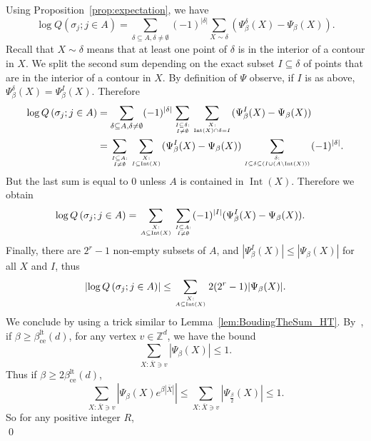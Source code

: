\documentclass{amsart}
\newcommand{\field}[1]{\mathbb{#1}}
\newcommand{\Z}{\field{Z}}
\DeclareMathOperator\Int{Int}
\numberwithin{equation}{section}
\theoremstyle{remark}
\renewenvironment{proof}[1][Proof]{\begin{trivlist}
\item[\hskip \labelsep {\bfseries #1:}]}{\qed\end{trivlist}}
\begin{document}
\begin{proof}
Using Proposition~\ref{prop:expectation}, we have
\[
\log Q \left(\sigma_j; j \in A \right)  = \sum_{\delta \subseteq A, \delta \neq \emptyset} (-1)^{|\delta|} \sum_{X \sim \delta} (\Psi^{\delta}_{\beta}(X) -  \Psi_{\beta}(X)).\]
Recall that $X \sim \delta$ means that at least one point of $\delta$ is in the interior of a contour in $X$.
We split the second sum depending on the exact subset $I \subseteq \delta$ of points that are in the interior of a contour in $X$.
By definition of $\Psi$ observe, if $I$ is as above, $\Psi^{\delta}_{\beta}(X)= \Psi^{I}_{\beta}(X)$.
Therefore
\begin{align*}
\log Q \left(\sigma_j; j \in A \right) &=  \sum_{\delta \subseteq A, \delta \neq \emptyset} (-1)^{|\delta|} \sum_{ I \subseteq \delta : \atop I \neq \emptyset} \sum_{X : \atop \Int(X) \cap \delta =I } (\Psi^{I}_{\beta}(X) -  \Psi_{\beta}(X))
\\ &= \sum_{ I \subseteq A : \atop I \neq \emptyset} \sum_{X : \atop I \subseteq \Int(X)} (\Psi^{I}_{\beta}(X) -  \Psi_{\beta}(X)) \sum_{\delta : \atop I \subseteq \delta \subseteq (I \cup  (A \setminus \Int(X)))} (-1)^{|\delta|}.
\end{align*}
But the last sum is equal to $0$ unless $A$ is contained in $\Int(X)$. Therefore we obtain
\begin{align*}
\log Q  \left(\sigma_j; j \in A \right)  &= \sum_{X : \atop A \subseteq \Int(X)} \sum_{ I \subseteq A : \atop I \neq \emptyset} (-1)^{|I|}(\Psi^{I}_{\beta}(X) -  \Psi_{\beta}(X)).
\end{align*}
Finally, there are $2^r-1$ non-empty subsets of $A$, and $|\Psi^{I}_{\beta}(X)| \leq |\Psi_{\beta}(X)|$ for all $X$ and $I$, thus
\begin{equation}
\label{eq:boundlogQ}
\left| \log Q \left(\sigma_j; j \in A \right) \right| \leq \sum_{X : \atop A \subseteq \Int(X)} 2(2^r-1) |\Psi_{\beta}(X)|.
\end{equation}
We conclude by using a trick similar to Lemma~\ref{lem:BoudingTheSum_HT}.
By~\cite[Equation (5.31)]{Velenik}, if $\beta \geq \beta_{\text{ce}}^{\text{lt}}(d)$, for any vertex $v \in \Z^d$, we have the bound
$$\sum_{X: \overline{X} \ni v} \left| \Psi_{\beta} (X)\right| \leq 1.$$
Thus if $\beta \geq 2 \beta_{\text{ce}}^{\text{lt}}(d)$,
$$ \sum_{X: \overline{X} \ni v} \left| \Psi_{\beta}(X) e^{\beta |\overline{X}|}\right| \leq \sum_{X: \overline{X} \ni v} \left| \Psi_{\frac{\beta}{2}} (X)\right| \leq 1.$$
So for any positive integer $R$,
\begin{equation}

\end{equation}
\end{proof}
\end{document}

